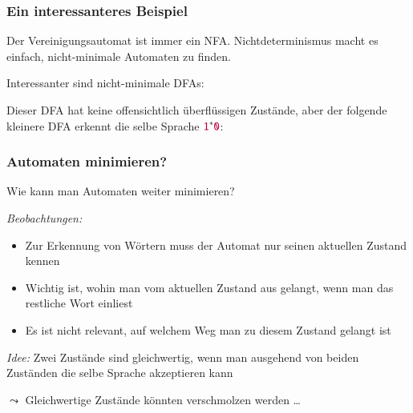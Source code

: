 \documentclass[onlymath]{beamer}
\begin{document}
\begin{frame}\frametitle{Ein interessanteres Beispiel}

Der Vereinigungsautomat ist immer ein NFA. Nichtdeterminismus macht es einfach, nicht-minimale Automaten zu finden.
\medskip

Interessanter sind nicht-minimale DFAs:\medskip

\pause

Dieser DFA hat keine offensichtlich überflüssigen Zustände, aber der folgende kleinere DFA erkennt die selbe Sprache $\mathtt{\textcolor{purple}{1}}^*\mathtt{\textcolor{purple}{0}}$:\medskip


\end{frame}

\begin{frame}\frametitle{Automaten minimieren?}

\alert{Wie kann man Automaten weiter minimieren?}
\bigskip

\emph{Beobachtungen:}
\begin{itemize}
\item Zur Erkennung von Wörtern muss der Automat nur seinen aktuellen Zustand kennen
\item Wichtig ist, wohin man vom aktuellen Zustand aus gelangt, wenn man das restliche Wort einliest
\item Es ist nicht relevant, auf welchem Weg man zu diesem Zustand gelangt ist
\end{itemize}\medskip\pause

\emph{Idee:} Zwei Zustände sind gleichwertig, wenn man ausgehend von beiden Zuständen die selbe Sprache akzeptieren kann
\bigskip

$\leadsto$ Gleichwertige Zustände könnten verschmolzen werden \ldots

\end{frame}
\end{document}
